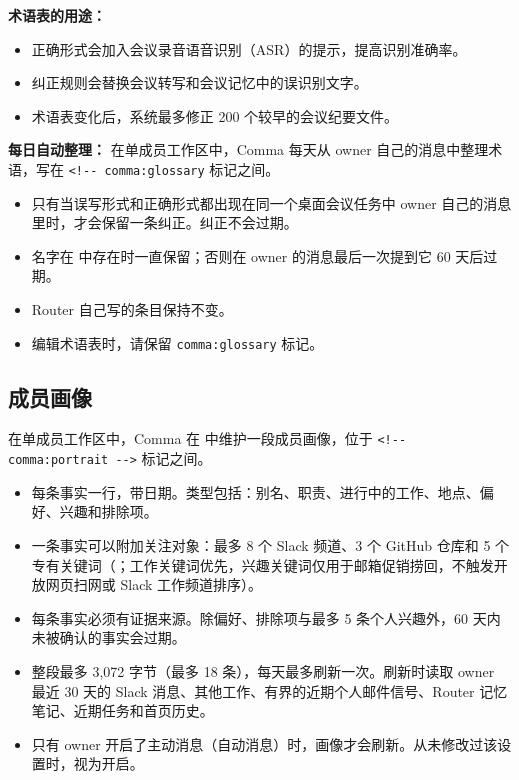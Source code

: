 \documentclass[UTF8,a4paper,11pt]{ctexart}
\begin{document}
\textbf{术语表的用途：}

\begin{itemize}
  \item 正确形式会加入会议录音语音识别（ASR）的提示，提高识别准确率。
  \item 纠正规则会替换会议转写和会议记忆中的误识别文字。
  \item 术语表变化后，系统最多修正 200 个较早的会议纪要文件。
\end{itemize}

\textbf{每日自动整理：} 在单成员工作区中，Comma 每天从 owner 自己的消息中整理术语，写在 \texttt{<!-{}- comma:glossary} 标记之间。

\begin{itemize}
  \item 只有当误写形式和正确形式都出现在同一个桌面会议任务中 owner 自己的消息里时，才会保留一条纠正。纠正不会过期。
  \item 名字在  中存在时一直保留；否则在 owner 的消息最后一次提到它 60 天后过期。
  \item Router 自己写的条目保持不变。
  \item 编辑术语表时，请保留 \texttt{comma:glossary} 标记。
\end{itemize}

\subsection{成员画像}

在单成员工作区中，Comma 在  中维护一段成员画像，位于 \texttt{<!-{}- comma:portrait -{}->} 标记之间。

\begin{itemize}
  \item 每条事实一行，带日期。类型包括：别名、职责、进行中的工作、地点、偏好、兴趣和排除项。
  \item 一条事实可以附加关注对象：最多 8 个 Slack 频道、3 个 GitHub 仓库和 5 个专有关键词（；工作关键词优先，兴趣关键词仅用于邮箱促销捞回，不触发开放网页扫网或 Slack 工作频道排序）。
  \item 每条事实必须有证据来源。除偏好、排除项与最多 5 条个人兴趣外，60 天内未被确认的事实会过期。
  \item 整段最多 3,072 字节（最多 18 条），每天最多刷新一次。刷新时读取 owner 最近 30 天的 Slack 消息、其他工作、有界的近期个人邮件信号、Router 记忆笔记、近期任务和首页历史。
  \item 只有 owner 开启了主动消息（自动消息）时，画像才会刷新。从未修改过该设置时，视为开启。
\end{itemize}
\end{document}
